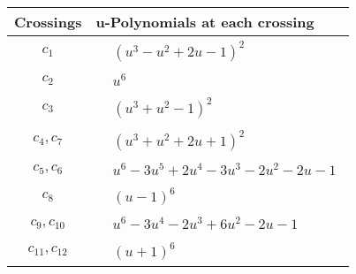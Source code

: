 \documentclass[1p]{elsarticle_modified}
\theoremstyle{definition}
\begin{document}
\begin{tabular}{m{50pt}|m{274pt}}
Crossings & \hspace{64pt}u-Polynomials at each crossing \\
\hline $$\begin{aligned}c_{1}\end{aligned}$$&$\begin{aligned}
&(u^3- u^2+2 u-1)^2
\end{aligned}$\\
\hline $$\begin{aligned}c_{2}\end{aligned}$$&$\begin{aligned}
&u^6
\end{aligned}$\\
\hline $$\begin{aligned}c_{3}\end{aligned}$$&$\begin{aligned}
&(u^3+u^2-1)^2
\end{aligned}$\\
\hline $$\begin{aligned}c_{4},c_{7}\end{aligned}$$&$\begin{aligned}
&(u^3+u^2+2 u+1)^2
\end{aligned}$\\
\hline $$\begin{aligned}c_{5},c_{6}\end{aligned}$$&$\begin{aligned}
&u^6-3 u^5+2 u^4-3 u^3-2 u^2-2 u-1
\end{aligned}$\\
\hline $$\begin{aligned}c_{8}\end{aligned}$$&$\begin{aligned}
&(u-1)^6
\end{aligned}$\\
\hline $$\begin{aligned}c_{9},c_{10}\end{aligned}$$&$\begin{aligned}
&u^6-3 u^4-2 u^3+6 u^2-2 u-1
\end{aligned}$\\
\hline $$\begin{aligned}c_{11},c_{12}\end{aligned}$$&$\begin{aligned}
&(u+1)^6
\end{aligned}$\\
\hline
\end{tabular}\\~\\
\end{document}
